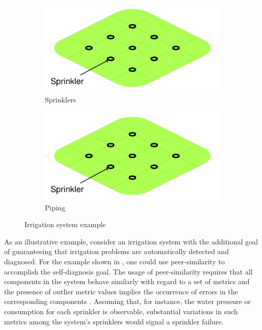 \begin{figure}[ht]
  \begin{subfigure}{\columnwidth}
    \includegraphics[page=1]{figures/introduction/figures/main.pdf}
    \caption{Sprinklers\label{fig:intro:irrigation-example-sprinklers}}
  \end{subfigure}


  \begin{subfigure}{\columnwidth}
    \includegraphics[page=2]{figures/introduction/figures/main.pdf}
    \caption{Piping\label{fig:intro:irrigation-example-piping}}
  \end{subfigure}
  \caption{Irrigation system example\label{fig:intro:irrigation-example}}
\end{figure}

As an illustrative example, consider an irrigation system with the
additional goal of guaranteeing that irrigation problems are
automatically detected and diagnosed.
%
For the example shown in
, one could use
peer-similarity to accomplish the self-diagnosis goal.
%
The usage of peer-similarity requires that all
components in the system behave similarly with regard to a set of
metrics and the presence of outlier metric values implies the
occurrence of errors in the corresponding components
\citep{Kasick10,Shvachko10,Tan10}.
%
Assuming that, for instance, the water pressure or consumption for
each sprinkler is observable, substantial variations in such metrics
among the system's sprinklers would signal a sprinkler failure.



